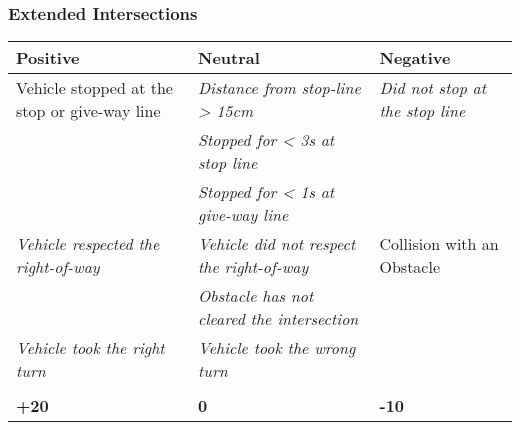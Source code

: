 {\subsubsection*{Extended Intersections}
\begin{table}[H]
    \begin{tabularx}{\textwidth}{XXX}
        \toprule
        \textbf{Positive}                                           & \textbf{Neutral}                                                   & \textbf{Negative}                                      \\
        \midrule
        Vehicle stopped at the stop or give-way line                & \textit{Distance from stop-line > 15cm}\footnotemark[1]            & \textit{Did not stop at the stop line}\footnotemark[1] \\
                                                                    & \textit{Stopped for < 3s at stop line}\footnotemark[1]             &                                                        \\
                                                                    & \textit{Stopped for < 1s at give-way line}\footnotemark[3]         &                                                        \\
        \textit{Vehicle respected the right-of-way}\footnotemark[2] & \textit{Vehicle did not respect the right-of-way}\footnotemark[2]  & Collision with an Obstacle                             \\
                                                                    & \textit{Obstacle has not cleared the intersection}\footnotemark[2] &                                                        \\
        \textit{Vehicle took the right turn}\footnotemark[4]        & \textit{Vehicle took the wrong turn}\footnotemark[4]               &                                                        \\
                                                                    &                                                                    &                                                        \\
        \topstrut
        \textbf{+20}                                                & \textbf{0}                                                         & \textbf{-10}                                           \\
        \bottomrule
    \end{tabularx}
\end{table}

}
